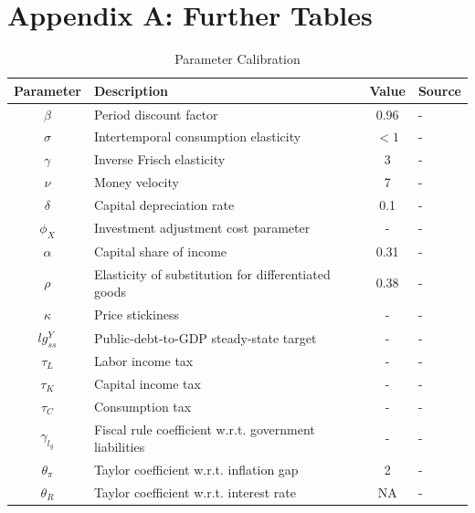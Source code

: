 \documentclass[12pt]{article}
\begin{document}
\section*{Appendix A: Further Tables}
\begin{table}[ht]
    \centering
    \caption{Parameter Calibration}
    \begin{tabular}{clcl}
        \toprule
        Parameter & Description & Value & Source \\ \midrule
        $\beta$ & Period discount factor  & 0.96 & - \\
        $\sigma$ & Intertemporal consumption elasticity  & $<1$ & - \\
        $\gamma$ & Inverse Frisch elasticity  & 3 & - \\
        $\nu$ & Money velocity  & 7 & - \\
        $\delta$ & Capital depreciation rate  & 0.1 & - \\
        $\phi_X$ & Investment adjustment cost parameter & - & - \\
        $\alpha$ & Capital share of income & 0.31 & - \\
        $\rho$ & Elasticity of substitution for differentiated goods &  0.38 & - \\
        $\kappa$ & Price stickiness & - & - \\
        $lg^Y_{ss}$ & Public-debt-to-GDP steady-state target & - & - \\
        ${\tau_L}$ & Labor income tax & - & - \\
        ${\tau_K}$ & Capital income tax & - & - \\
        ${\tau_C}$ & Consumption tax & - & -  \\
        ${\gamma_{l_g}}$ & Fiscal rule coefficient w.r.t. government liabilities & - & -  \\
        ${\theta_{\pi}}$ & Taylor coefficient w.r.t. inflation gap & 2 & - \\
        $\theta_R$ & Taylor coefficient w.r.t. interest rate & NA  & - \\  \bottomrule
    \end{tabular}
    \label{tab:parameters}
\end{table}
\end{document}
